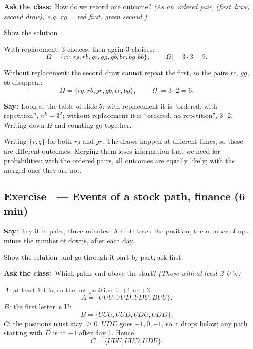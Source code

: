 \documentclass[11pt,a4paper,parskip=half]{scrartcl}
\newcommand{\Om}{\Omega}
\newcommand{\say}{\textbf{\color{teal}Say:}\ }
\newcommand{\ask}{\textbf{\color{navy}Ask the class:}\ }
\begin{document}
\ask How do we record one outcome? \emph{(As an ordered pair, (first draw,
second draw), e.g.\ $rg$ = red first, green second.)}

\begin{slidecue}
	Show the solution.
\end{slidecue}

With replacement: 3 choices, then again 3 choices:
\[ \Om=\{rr,rg,rb,gr,gg,gb,br,bg,bb\},\qquad |\Om|=3\cdot3=9. \]

Without replacement: the second draw cannot repeat the first, so the pairs
$rr$, $gg$, $bb$ disappear:
\[ \Om=\{rg,rb,gr,gb,br,bg\},\qquad |\Om|=3\cdot2=6. \]

\say Look at the table of slide 5: with replacement it is ``ordered, with
repetition'', $n^k=3^2$; without replacement it is ``ordered, no
repetition'', $3\cdot2$. Writing down $\Om$ and counting go together.

\begin{mistake}
	Writing $\{r,g\}$ for both $rg$ and $gr$. The draws happen at different
	times, so these are different outcomes. Merging them loses information
	that we need for probabilities: with the ordered pairs, all outcomes are
	equally likely; with the merged ones they are not.
\end{mistake}

\subsection{Exercise~ --- Events of a stock path, finance (6 min)}


\say Try it in pairs, three minutes. A hint: track the position, the number
of ups minus the number of downs, after each day.

\begin{slidecue}
	Show the solution, and go through it part by part; ask first.
\end{slidecue}

\ask Which paths end above the start? \emph{(Those with at least 2 U's.)}

$A$: at least 2 U's, so the net position is $+1$ or $+3$:
\[ A=\{UUU,UUD,UDU,DUU\}. \]
$B$: the first letter is U:
\[ B=\{UUU,UUD,UDU,UDD\}. \]
$C$: the positions must stay $\ge0$. $UDD$ goes $+1,0,-1$, so it drops
below; any path starting with $D$ is at $-1$ after day 1. Hence
\[ C=\{UUU,UUD,UDU\}. \]
\end{document}
